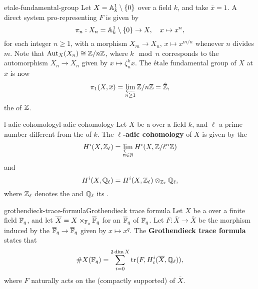 \begin{example}{etale-fundamental-group}
    Let $X = \AA^1_k \setminus \{ 0 \}$ over a field $k$, and take $\overline{x} = 1$. A direct system pro-representing $F$ is given by
    \[ \pi_n : X_n = \AA^1_k \setminus \{ 0 \} \to X, \quad x \mapsto x^n , \]
    for each integer $n \ge 1$, with a morphism $X_m \to X_n$, $x \mapsto x^{m/n}$ whenever $n$ divides $m$. Note that $\textup{Aut}_X(X_n) \isom \ZZ/n\ZZ$, where $k \mod n$ corresponds to the automorphism $X_n \to X_n$ given by $x \mapsto \zeta_n^k x$. The étale fundamental group of $X$ at $\overline{x}$ is now
    \[ \pi_1(X, \overline{x}) = \varprojlim_{n \ge 1} \ZZ/n\ZZ = \hat{\ZZ} , \]
    the  of $\ZZ$.
\end{example}

\begin{topic}{l-adic-cohomology}{l-adic cohomology}
    Let $X$ be a  over a field $k$, and $\ell$ a prime number different from the  of $k$. The \textbf{$\ell$-adic cohomology} of $X$ is given by the 
    \[ H^i(X, \ZZ_\ell) = \varprojlim_{n \in \NN} H^i(X, \ZZ/\ell^n \ZZ) \]
    and
    \[ H^i(X, \QQ_\ell) = H^i(X, \ZZ_\ell) \otimes_{\ZZ_\ell} \QQ_\ell , \]
    where $\ZZ_\ell$ denotes the  and $\QQ_\ell$ its .
\end{topic}

\begin{topic}{grothendieck-trace-formula}{Grothendieck trace formula}
    Let $X$ be a  over a finite field $\FF_q$, and let $\overline{X} = X \times_{\FF_q} \overline{\FF}_q$ for an  $\overline{\FF}_q$ of $\FF_q$. Let $F : \overline{X} \to \overline{X}$ be the morphism induced by the  $\overline{\FF}_q \to \overline{\FF}_q$ given by $x \mapsto x^q$. The \textbf{Grothendieck trace formula} states that
    \[ \# X(\FF_q) = \sum_{i = 0}^{2 \dim X} \tr(F, H^i_c(\overline{X}, \QQ_\ell)) , \]
    where $F$ naturally acts on the (compactly supported)  of $\overline{X}$.
\end{topic}

